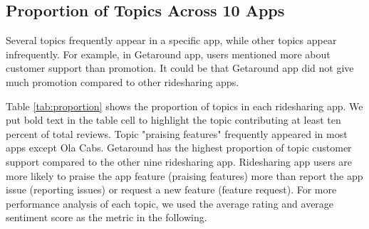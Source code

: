 \documentclass[12pt]{article}
\begin{document}
\clearpage
\newpage
\subsection{Proportion of Topics Across 10 Apps}
Several topics frequently appear in a specific app, while other topics appear infrequently. For example, in Getaround app, users mentioned more about customer support than promotion. It could be that Getaround app did not give much promotion compared to other ridesharing apps.

Table \ref{tab:proportion} shows the proportion of topics in each ridesharing app. We put bold text in the table cell to highlight the topic contributing at least ten percent of total reviews. Topic "praising features" frequently appeared in most apps except Ola Cabs. Getaround has the highest proportion of topic customer support compared to the other nine ridesharing app. Ridesharing app users are more likely to praise the app feature (praising features) more than report the app issue (reporting issues) or request a new feature (feature request). For more performance analysis of each topic, we used the average rating and average sentiment score as the metric in the following.
\end{document}
